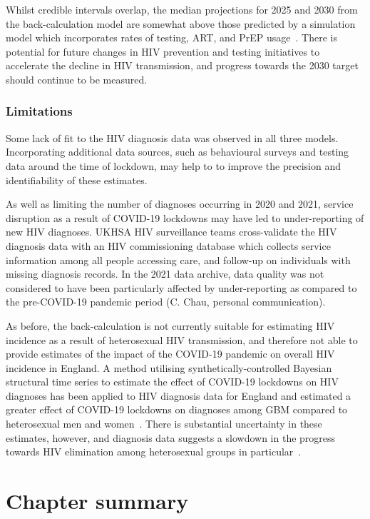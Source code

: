 Whilst credible intervals overlap, the median projections for 2025 and 2030 from the back-calculation model are somewhat above those predicted by a simulation model which incorporates rates of testing, ART, and PrEP usage~\parencite{Cambiano2023-lj}. There is potential for future changes in HIV prevention and testing initiatives to accelerate the decline in HIV transmission, and progress towards the 2030 target should continue to be measured.

\subsubsection{Limitations}

Some lack of fit to the HIV diagnosis data was observed in all three models. Incorporating additional data sources, such as behavioural surveys and testing data around the time of lockdown, may help to to improve the precision and identifiability of these estimates.

As well as limiting the number of diagnoses occurring in 2020 and 2021, service disruption as a result of COVID-19 lockdowns may have led to under-reporting of new HIV diagnoses. UKHSA HIV surveillance teams cross-validate the HIV diagnosis data with an HIV commissioning database which collects service information among all people accessing care, and follow-up on individuals with missing diagnosis records. In the 2021 data archive, data quality was not considered to have been particularly affected by under-reporting as compared to the pre-COVID-19 pandemic period (C. Chau, personal communication).

As before, the back-calculation is not currently suitable for estimating HIV incidence as a result of heterosexual HIV transmission, and therefore not able to provide estimates of the impact of the COVID-19 pandemic on overall HIV incidence in England. A method utilising synthetically-controlled Bayesian structural time series to estimate the effect of COVID-19 lockdowns on HIV diagnoses has been applied to HIV diagnosis data for England and estimated a greater effect of COVID-19 lockdowns on diagnoses among GBM compared to heterosexual men and women~\parencite{Muhammed2024-dw}. There is substantial uncertainty in these estimates, however, and diagnosis data suggests a slowdown in the progress towards HIV elimination among heterosexual groups in particular~\parencite{Martin2023-um}.

\section{Chapter summary}

